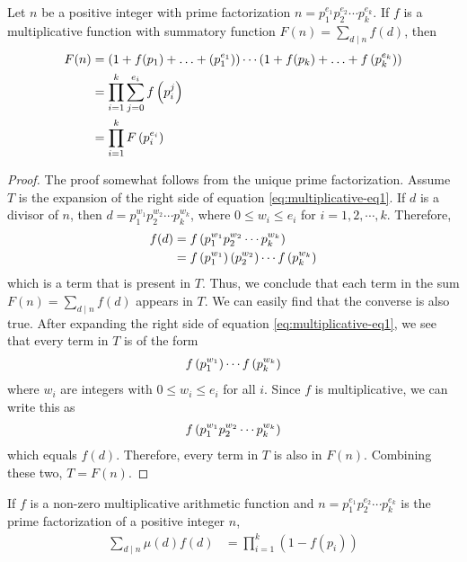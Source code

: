 	\begin{theorem}\label{thm:sumfunction}
		Let $n$ be a positive integer with prime factorization $n=p_1^{e_1}p_2^{e_2} \cdots p_k^{e_k}$. If $f$ is a multiplicative function with summatory function $F(n)=\sum\limits_{d\mid n}f(d)$, then
			\begin{align}
				F(n)
				& =
					\left(1+f(p_1)+\ldots+\left(p_1^{e_1}\right)\right)\cdots\left(1+f(p_k)+\ldots+f\left(p_k^{e_k}\right)\right) \label{eq:multiplicative-eq1}\\
				& =
				\prod_{i=1}^k\sum_{j=0}^{e_i}f\left(p_i^j\right) \nonumber\\
				& = \prod_{i=1}^{k}F\left(p_i^{e_i}\right)\nonumber
			\end{align}
	\end{theorem}

	\begin{proof}
		The proof somewhat follows from the unique prime factorization. Assume $T$ is the expansion of the right side of equation \ref{eq:multiplicative-eq1}.
		If $d$ is a divisor of $n$, then $d=p_1^{w_1}p_2^{w_2}\cdots p_k^{w_k}$, where $0\leq w_i\leq e_i$ for $i=1,2,\cdots,k$. Therefore,
			\begin{align*}
				f(d)    & =  f\left(p_1^{w_1}p_2^{w_2}\cdots p_k^{w_k}\right)\\
						& =  f\left(p_1^{w_1}\right)\left(p_2^{w_2}\right)\cdots f\left(p_k^{w_k}\right)
			\end{align*}
		which is a term that is present in $T$. Thus, we conclude that each term in the sum $F(n)=\sum\limits_{d\mid n}f(d)$ appears in $T$. We can easily find that the converse is also true. After expanding the right side of equation \ref{eq:multiplicative-eq1}, we see that every term in $T$ is of the form
			\begin{align*}
				f\left(p_1^{w_1}\right)\cdots f\left(p_k^{w_k}\right)
			\end{align*}
		where $w_i$ are integers with $0 \leq w_i \leq e_i$ for all $i$. Since $f$ is multiplicative, we can write this as
			\begin{align*}
				f\left(p_1^{w_1}p_2^{w_2}\cdots p_k^{w_k}\right)
			\end{align*}
		which equals $f(d)$. Therefore, every term in $T$ is also in $F(n)$. Combining these two, $T=F(n)$.
	\end{proof}

	\begin{corollary}
		If $f$ is a non-zero multiplicative arithmetic function and $n=p_1^{e_1}p_2^{e_2} \cdots p_k^{e_k}$ is the prime factorization of a positive integer $n$,
			\begin{align*}
				\sum\limits_{d\mid n}\mu(d)f(d)
					& = \prod_{i=1}^{k} (1-f(p_i))
			\end{align*}
	\end{corollary}

